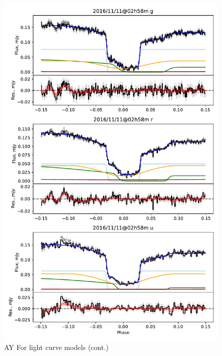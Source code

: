 \begin{figure}
    \centering
    \includegraphics[width=\textwidth]{figures/results/AYFor/AYFor_3.pdf}
    \caption{AY For light curve models (cont.)}
    \label{fig:AYFor all light curves cont 2}
\end{figure}
